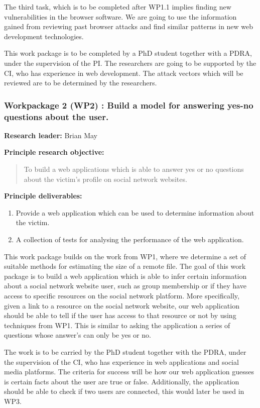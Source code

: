 \documentclass[a4paper,11pt]{article}
\begin{document}
The third task, which is to be completed after WP1.1 implies finding new vulnerabilities in the browser software. We are going to use the information gained from reviewing past browser attacks and find similar patterns in new web development technologies. 

This work package is to be completed by a PhD student together with a PDRA, under the supervision of the PI. The researchers are going to be supported by the CI, who has experience in web development. The attack vectors which will be reviewed are to be determined by the researchers.

\subsubsection*{Workpackage 2 (WP2) : Build a model for answering yes-no questions about the user.}
\textbf{Research leader:} Brian May

\textbf{Principle research objective:}
\begin{quote}
	To build a web applications which is able to answer yes or no questions about the victim's profile on social network websites.
\end{quote}

\textbf{Principle deliverables:}
\begin{enumerate}
\item Provide a web application which can be used to determine information about the victim.
\item A collection of tests for analysing the performance of the web application.
\end{enumerate}

This work package builds on the work from WP1, where we determine a set of suitable methods for estimating the size of a remote file. The goal of this work package is to build a web application which is able to infer certain information about a social network website user, such as group membership or if they have access to specific resources on the social network platform. More specifically, given a link to a resource on the social network website, our web application should be able to tell if the user has access to that resource or not by using techniques from WP1. This is similar to asking the application a series of questions whose answer's can only be yes or no.

The work is to be carried by the PhD student together with the PDRA, under the supervision of the CI, who has experience in web applications and social media platforms. The criteria for success will be how  our web application guesses is certain facts about the user are true or false. Additionally, the application should be able to check if two users are connected, this would later be used in WP3. 
\end{document}
